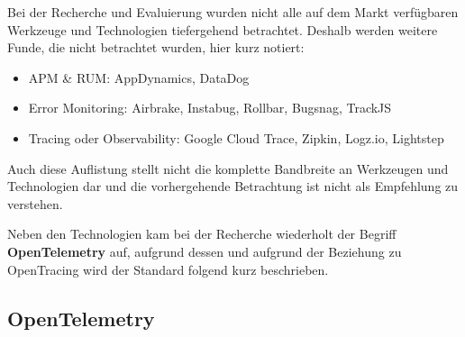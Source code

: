 Bei der Recherche und Evaluierung wurden nicht alle auf dem Markt verfügbaren Werkzeuge und Technologien tiefergehend betrachtet. Deshalb werden weitere Funde, die nicht betrachtet wurden, hier kurz notiert:

\begin{itemize}
	\item APM \& RUM: AppDynamics, DataDog
	\item Error Monitoring: Airbrake, Instabug, Rollbar, Bugsnag, TrackJS
	\item Tracing oder Observability: Google Cloud Trace, Zipkin, Logz.io, Lightstep
\end{itemize}

Auch diese Auflistung stellt nicht die komplette Bandbreite an Werkzeugen und Technologien dar und die vorhergehende Betrachtung ist nicht als Empfehlung zu verstehen.

Neben den Technologien kam bei der Recherche wiederholt der Begriff \textbf{OpenTelemetry} auf, aufgrund dessen und aufgrund der Beziehung zu OpenTracing wird der Standard folgend kurz beschrieben.

\newpage

\subsection{OpenTelemetry}

